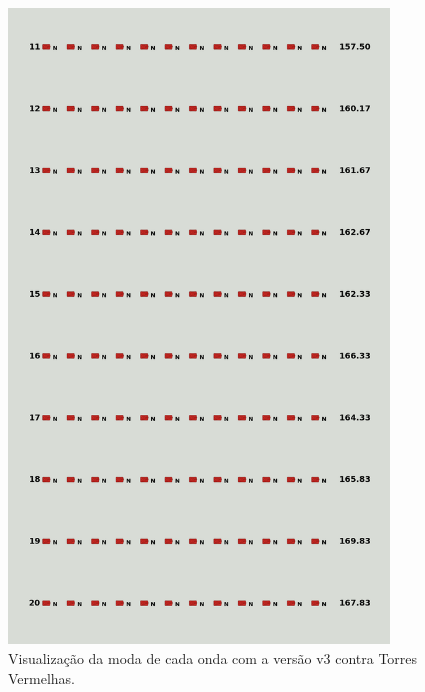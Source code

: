 \begin{figure}[H]
  \centering
  \includegraphics[width=0.9\textwidth]{figuras/td/td_allred_ai_mode_3_2.png}
  \caption{Visualização da moda de cada onda com a versão v3 contra Torres Vermelhas.}
  \label{fig:td-moda-red-3-2}
\end{figure}

